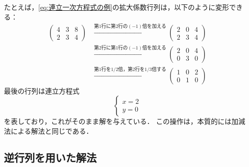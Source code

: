 たとえば，\eqref{eq:連立一次方程式の例}の拡大係数行列は，以下のように変形できる：
\begin{align*}
  \begin{pmatrix}
    4 & 3 & 8 \\
    2 & 3 & 4
  \end{pmatrix}
  &\xrightarrow{\text{第1行に第2行の$(-1)$倍を加える}}
  \begin{pmatrix}
    2 & 0 & 4 \\
    2 & 3 & 4
  \end{pmatrix} \\
  &\xrightarrow{\text{第2行に第1行の$(-1)$倍を加える}}
  \begin{pmatrix}
    2 & 0 & 4 \\
    0 & 3 & 0
  \end{pmatrix} \\
  &\xrightarrow{\text{第1行を$1/2$倍，第2行を$1/3$倍する}}
  \begin{pmatrix}
    1 & 0 & 2 \\
    0 & 1 & 0
  \end{pmatrix}
\end{align*}
最後の行列は連立方程式
\[
  \begin{cases}
    x = 2 \\
    y = 0
  \end{cases}
\]
を表しており，これがそのまま解を与えている．
この操作は，本質的には加減法による解法と同じである．

\subsection{逆行列を用いた解法}

